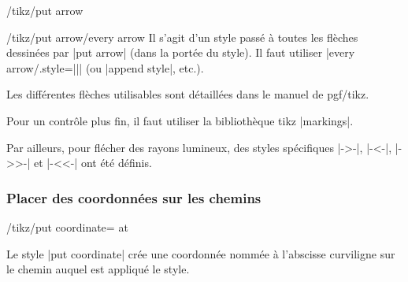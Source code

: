 \documentclass[a4paper]{ltxdoc}
\begin{document}
\begin{key}{/tikz/put arrow}
\begin{stylekey}{/tikz/put arrow/every arrow}
  Il s'agit d'un style passé à toutes les flèches dessinées par |put arrow| (dans la portée du style). Il faut utiliser |every arrow/.style={||}| (ou |append style|, etc.).
\end{stylekey}

\begin{codeexample}[width=3cm]
\end{codeexample}



Les différentes flèches utilisables sont détaillées dans le manuel de pgf/tikz.

Pour un contrôle plus fin, il faut utiliser la bibliothèque tikz |markings|.

Par ailleurs, pour flécher des rayons lumineux, des styles spécifiques |->-|, |-<-|, |->>-| et |-<<-| ont été définis.

\end{key}

\subsubsection{Placer des coordonnées sur les chemins}

\begin{key}{/tikz/put coordinate= at }

Le style |put coordinate| crée une coordonnée nommée 
à l'abscisse curviligne  sur le chemin auquel est appliqué le style.

\begin{codeexample}[width=6cm]
\end{codeexample}

\end{key}
\end{document}
